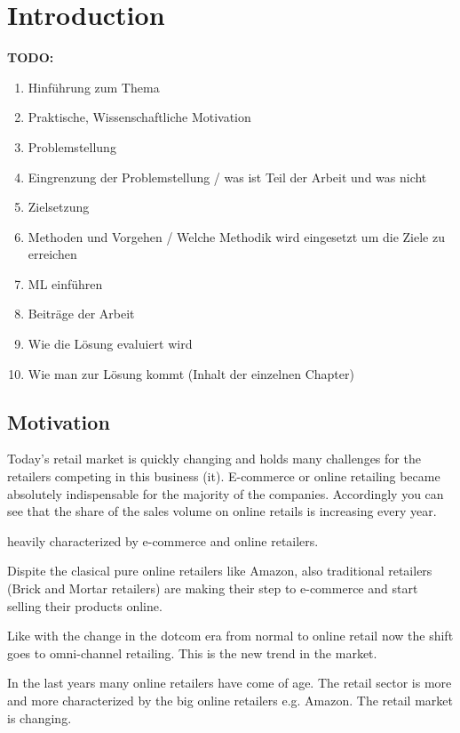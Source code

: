 \chapter{Introduction} 
\label{sec:chapter1}

\begin{framed}
\textbf{TODO:}
\begin{enumerate}
\item Hinführung zum Thema
\item Praktische, Wissenschaftliche Motivation
\item Problemstellung
\item Eingrenzung der Problemstellung / was ist Teil der Arbeit und was nicht
\item Zielsetzung
\item Methoden und Vorgehen / Welche Methodik wird eingesetzt um die Ziele zu erreichen
\item ML einführen
\item Beiträge der Arbeit
\item Wie die Lösung evaluiert wird
\item Wie man zur Lösung kommt (Inhalt der einzelnen Chapter)
\end{enumerate}
\end{framed}

\section{Motivation}

Today's retail market is quickly changing and holds many challenges for the retailers competing in this business (it). E-commerce or online retailing became absolutely indispensable for the majority of the companies. Accordingly you can see that the share of the sales volume on online retails is increasing every year.


heavily characterized by e-commerce and online retailers. 

Dispite the clasical pure online retailers like Amazon, also traditional retailers (Brick and Mortar retailers) are making their step to e-commerce and start selling their products online.


Like with the change in the dotcom era from normal to online retail now the shift goes to omni-channel retailing. This is the new trend in the market.


In the last years many online retailers have come of age. The retail sector is more and more characterized by the big online retailers e.g. Amazon. The retail market is changing. 

